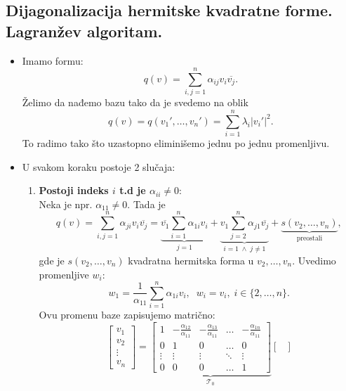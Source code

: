 \documentclass[a4paper,12pt,twoside]{report}
\numberwithin{algorithm}{section}
\begin{document}
\subsection{Dijagonalizacija hermitske kvadratne forme. Lagranžev algoritam.}

\begin{itemize}
    \item Imamo formu:
    \[ q(v) = \sum_{i, j = 1}^{n} \alpha_{ij}v_i\overline{v_j}. \]
    Želimo da nađemo bazu tako da je svedemo na oblik
    \[ q(v) = q(v_1', \dots, v_n') = \sum_{i=1}^{n}\lambda_i |v_i'|^2. \]
    To radimo tako što uzastopno eliminišemo jednu po jednu promenljivu.
    \item U svakom koraku postoje 2 slučaja:
    \begin{enumerate}
        \item \textbf{Postoji indeks $i$ t.d je $\alpha_{ii} \neq 0$}:\\
        Neka je npr. $\alpha_{11} \neq 0$. Tada je
        \begin{equation}
            \label{LagranzevAlgoritam1}
            q(v) = \sum_{i, j = 1}^{n}\alpha_{ji}v_i\overline{v_j} = \underbrace{\overline{v_1}\sum_{i=1}^{n}\alpha_{1i}v_i}_{j = 1}
        + \underbrace{v_1\sum_{j=2}^{n}\alpha_{j1}\overline{v_j}}_{i = 1 \; \land \; j \neq 1} + \underbrace{s(v_2, \dots, v_n)}_{\text{preostali}},
        \end{equation}
        gde je $s(v_2, \dots, v_n)$ kvadratna hermitska forma u $v_2, \dots, v_n$. Uvedimo promenljive $w_i$:
        \[ w_1 = \frac{1}{\alpha_{11}}\sum_{i=1}^{n}\alpha_{1i}v_i, \;\; w_i = v_i, \; i \in \{2, \dots, n\}. \]
        Ovu promenu baze zapisujemo matrično:
        \[ \begin{bmatrix}
            v_1 \\ v_2 \\ \vdots \\ v_n
        \end{bmatrix} = \underbrace{\begin{bmatrix}
            1 & -\frac{\alpha_{12}}{\alpha_{11}} & -\frac{\alpha_{13}}{\alpha_{11}} & \dots & -\frac{\alpha_{1n}}{\alpha_{11}} \\
            0 & 1 & 0 & \dots & 0 \\
            \vdots & \vdots & \vdots & \ddots & \vdots \\
            0 & 0 & 0 & \dots & 1
        \end{bmatrix}}_{\mathcal{T}_0} \begin{bmatrix}

\end{bmatrix}\]
\end{enumerate}
\end{itemize}
\end{document}
